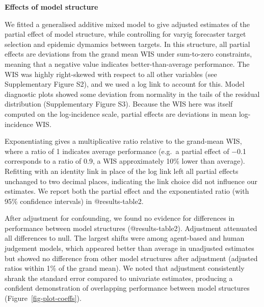 \documentclass[
  letterpaper,
  DIV=11,
  numbers=noendperiod]{scrartcl}
\begin{document}
\textbf{Effects of model structure}

We fitted a generalised additive mixed model to give adjusted estimates
of the partial effect of model structure, while controlling for varyig
forecaster target selection and epidemic dymamics between targets. In
this structure, all partial effects are deviations from the grand mean
WIS under sum-to-zero constraints, meaning that a negative value
indicates better-than-average performance. The WIS was highly
right-skewed with respect to all other variables (see Supplementary
Figure S2), and we used a log link to account for this. Model diagnostic
plots showed some deviation from normality in the tails of the residual
distribution (Supplementary Figure S3). Because the WIS here was itself
computed on the log-incidence scale, partial effects are deviations in
mean log-incidence WIS.

Exponentiating gives a multiplicative ratio relative to the grand-mean
WIS, where a ratio of 1 indicates average performance (e.g.~a partial
effect of −0.1 corresponds to a ratio of 0.9, a WIS approximately 10\%
lower than average). Refitting with an identity link in place of the log
link left all partial effects unchanged to two decimal places,
indicating the link choice did not influence our estimates. We report
both the partial effect and the exponentiated ratio (with 95\%
confidence intervals) in @results-table2.

After adjustment for confounding, we found no evidence for differences
in performance between model structures (@results-table2). Adjustment
attenuated all differences to null. The largest shifts were among
agent-based and human judgement models, which appeared better than
average in unadjusted estimates but showed no difference from other
model structures after adjustment (adjusted ratios within 1\% of the
grand mean). We noted that adjustment consistently shrank the standard
error compared to univariate estimates, producing a confident
demonstration of overlapping performance between model structures
(Figure~\ref{fig-plot-coeffs}).
\end{document}
